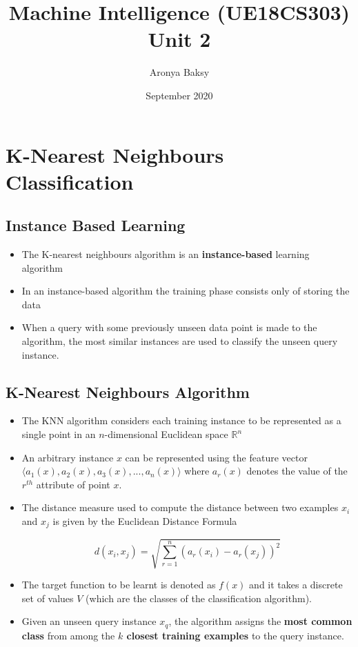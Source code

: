 \documentclass{article}
\title{Machine Intelligence (UE18CS303) \\
\large Unit 2}
\author{Aronya Baksy}
\date{September 2020}
\theoremstyle{plain}
\theoremstyle{definition}
\begin{document}
    \maketitle
\section{K-Nearest Neighbours Classification}
\subsection{Instance Based Learning}
\begin{itemize}
    \item The K-nearest neighbours algorithm is an \textbf{instance-based} learning algorithm
    
    \item In an instance-based algorithm the training phase consists only of storing the data
    
    \item When a query with some previously unseen data point is made to the algorithm, the most similar instances are used to classify the unseen query instance.
\end{itemize}

\subsection{K-Nearest Neighbours Algorithm}
\begin{itemize}
    \item The KNN algorithm considers each training instance to be represented as a single point in an $n$-dimensional Euclidean space $\mathbb{R}^n$
    
    \item An arbitrary instance $x$ can be represented using the feature vector
    $\langle a_1(x), a_2(x), a_3(x), ..., a_n(x) \rangle$ where $a_r(x)$ denotes the value of the $r^{th}$ attribute of point $x$. 
    
    \item The distance measure used to compute the distance between two examples $x_i$ and $x_j$ is given by the Euclidean Distance Formula
    
    \begin{equation}
        d(x_i, x_j) = \sqrt{\sum_{r=1}^{n} (a_r(x_i) - a_r(x_j))^2}
    \end{equation}
    
    \item The target function to be learnt is denoted as $f(x)$ and it takes a discrete set of values $V$ (which are the classes of the classification algorithm). 
    
    \item Given an unseen query instance $x_q$, the algorithm assigns the \textbf{most common class} from among the \textbf{$k$ closest training examples} to the query instance. 
\end{itemize}
\end{document}
